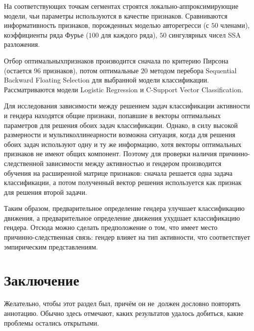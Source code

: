 \documentclass[12pt, twoside]{article}
\begin{document}
На соответствующих точкам сегментах строятся локально-аппроксимирующие модели, чьи параметры используются в качестве признаков. Сравниваются информативность признаков, порожденных моделью авторегресси (с $50$ членами), коэффициенты ряда Фурье ($100$ для каждого ряда), $50$ сингулярных чисел SSA разложения. 

Отбор оптимальныхпризнаков производится сначала по критерию Пирсона (остается $96$ признаков), потом оптимальные $20$ методом перебора Sequential Backward Floating Selection для выбранной модели классификации. Рассматриваются модели Logistic Regression и C-Support Vector Classification. 

Для исследования зависимости между решением задач классификации активности и гендера находятся общие признаки, попавшие в векторы оптимальных параметров для решения обоих задач классификации. Однако, в силу высокой размерности
и мультиколлинеарности возможна ситуация, когда для решения обоих задач используют одну и ту же информацию, хотя векторы оптимальных признаков не имеют общих компонент. Поэтому для проверки наличия причинно-следственной зависимости между активностью и гендером производится обучения на расширенной матрице признаков: сначала решается одна задача классификации, а потом полученный вектор решения используется как признак для решения второй задачи.


Таким образом, предварительное определение гендера улучшает классификацию движения, а предварительное определение движения ухудшает классификацию гендера. Отсюда можно сделать предположение о том, что имеет место причинно-следственная связь: гендер влияет на тип активности, что соответствует эмпирическим представлениям.



\section{Заключение}
Желательно, чтобы этот раздел был, причём он не~должен дословно повторять аннотацию.
Обычно здесь отмечают, каких результатов удалось добиться, какие проблемы остались открытыми.

	
\end{document}
